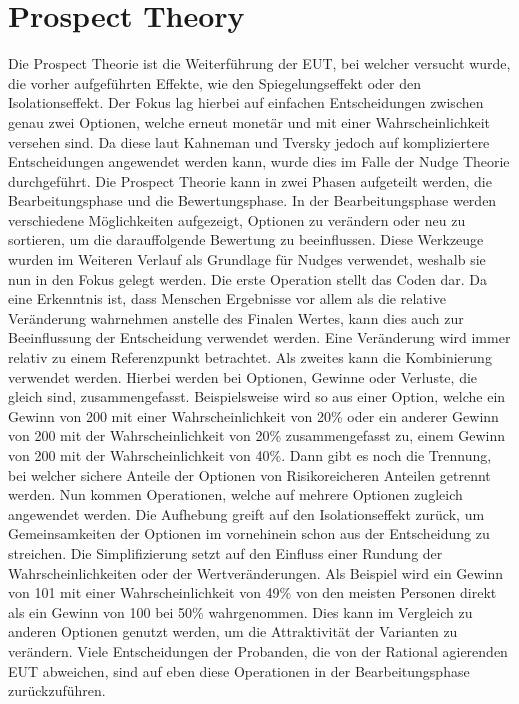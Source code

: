 \section{Prospect Theory}
Die Prospect Theorie ist die Weiterführung der EUT, bei welcher versucht wurde, die vorher aufgeführten Effekte, wie den Spiegelungseffekt oder den Isolationseffekt. Der Fokus lag hierbei auf einfachen Entscheidungen zwischen genau zwei Optionen, welche erneut monetär und mit einer Wahrscheinlichkeit versehen sind. 
Da diese laut Kahneman und Tversky jedoch auf kompliziertere Entscheidungen angewendet werden kann, wurde dies im Falle der Nudge Theorie durchgeführt. \parencite[S. 274]{Kahneman.2013} 
Die Prospect Theorie kann in zwei Phasen aufgeteilt werden, die Bearbeitungsphase und die Bewertungsphase. In der Bearbeitungsphase werden verschiedene Möglichkeiten aufgezeigt, Optionen zu verändern oder neu zu sortieren, um die darauffolgende Bewertung zu beeinflussen. Diese Werkzeuge wurden im Weiteren Verlauf als Grundlage für Nudges verwendet, weshalb sie nun in den Fokus gelegt werden. Die erste Operation stellt das Coden dar. Da eine Erkenntnis ist, dass Menschen Ergebnisse vor allem als die relative Veränderung wahrnehmen anstelle des Finalen Wertes, kann dies auch zur Beeinflussung der Entscheidung verwendet werden. Eine Veränderung wird immer relativ zu einem Referenzpunkt betrachtet. Als zweites kann die Kombinierung verwendet werden. Hierbei werden bei Optionen, Gewinne oder Verluste, die gleich sind, zusammengefasst. Beispielsweise wird so aus einer Option, welche ein Gewinn von 200 mit einer Wahrscheinlichkeit von 20\% oder ein anderer Gewinn von 200 mit der Wahrscheinlichkeit von 20\% zusammengefasst zu, einem Gewinn von 200 mit der Wahrscheinlichkeit von 40\%. Dann gibt es noch die Trennung, bei welcher sichere Anteile der Optionen von Risikoreicheren Anteilen getrennt werden. Nun kommen Operationen, welche auf mehrere Optionen zugleich angewendet werden. 
Die Aufhebung greift auf den Isolationseffekt zurück, um Gemeinsamkeiten der Optionen im vornehinein schon aus der Entscheidung zu streichen. 
Die Simplifizierung setzt auf den Einfluss einer Rundung der Wahrscheinlichkeiten oder der Wertveränderungen. Als Beispiel wird ein Gewinn von 101 mit einer Wahrscheinlichkeit von 49\% von den meisten Personen direkt als ein Gewinn von 100 bei 50\% wahrgenommen. Dies kann im Vergleich zu anderen Optionen genutzt werden, um die Attraktivität der Varianten zu verändern. 
Viele Entscheidungen der Probanden, die von der Rational agierenden EUT abweichen, sind auf eben diese Operationen in der Bearbeitungsphase zurückzuführen. \parencite[S. 46]{Tversky.1969}

